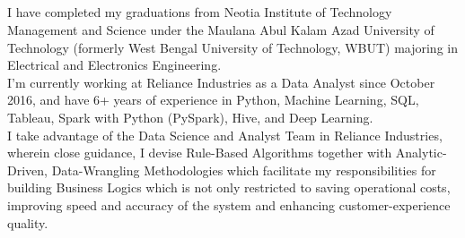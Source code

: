 \documentclass[10pt, a4paper]{article}
\begin{document}
	\begin{center}
		\textcolor{dBlue}{{\HeaderNFont \AuthorFName}\hspace{0.7cm}{\HeaderNFont \AuthorLName}} \\
		\vspace{2pt}
		{\small \textcolor{dBlue}{\CyberPresence}}
		\vspace{-23pt}
	\end{center}

	\textcolor{dBlue}{
		\\ \noindent\makebox[\linewidth]{\rule{\textwidth}{2.1pt}}
		\vspace{-21pt} \\
		\noindent\makebox[\linewidth]{\rule{\paperwidth}{3.9pt}}
		\vspace{-13pt} \\
	}



	I have completed my graduations from Neotia Institute of Technology Management and Science under the Maulana Abul Kalam Azad University of Technology (formerly West Bengal University of Technology, WBUT) majoring in Electrical and Electronics Engineering. \\[3pt]

	I'm currently working at Reliance Industries as a Data Analyst since October 2016, and have 6+ years of experience in Python, Machine Learning, SQL, Tableau, Spark with Python (PySpark), Hive, and Deep Learning. \\[3pt]

	I take advantage of the Data Science and Analyst Team in Reliance Industries, wherein close guidance, I devise Rule-Based Algorithms together with Analytic-Driven, Data-Wrangling Methodologies which facilitate my responsibilities for building Business Logics which is not only restricted to saving operational costs, improving speed and accuracy of the system and enhancing customer-experience quality. \\[3pt]
\end{document}

